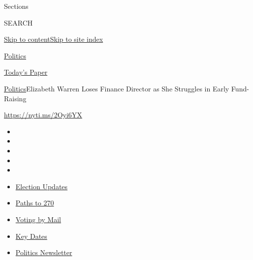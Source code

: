 Sections

SEARCH

\protect\hyperlink{site-content}{Skip to
content}\protect\hyperlink{site-index}{Skip to site index}

\href{https://www.nytimes3xbfgragh.onion/section/politics}{Politics}

\href{https://myaccount.nytimes3xbfgragh.onion/auth/login?response_type=cookie\&client_id=vi}{}

\href{https://www.nytimes3xbfgragh.onion/section/todayspaper}{Today's
Paper}

\href{/section/politics}{Politics}\textbar{}Elizabeth Warren Loses
Finance Director as She Struggles in Early Fund-Raising

\url{https://nyti.ms/2Oyi6YX}

\begin{itemize}
\item
\item
\item
\item
\item
\end{itemize}

\begin{itemize}
\item
  \href{https://www.nytimes3xbfgragh.onion/live/2020/09/08/us/trump-vs-biden?action=click\&pgtype=Article\&state=default\&region=TOP_BANNER\&context=storylines_menu}{Election
  Updates}
\item
  \href{https://www.nytimes3xbfgragh.onion/interactive/2020/us/elections/election-states-biden-trump.html?action=click\&pgtype=Article\&state=default\&region=TOP_BANNER\&context=storylines_menu}{Paths
  to 270}
\item
  \href{https://www.nytimes3xbfgragh.onion/interactive/2020/08/31/us/politics/vote-by-mail-deadlines.html?action=click\&pgtype=Article\&state=default\&region=TOP_BANNER\&context=storylines_menu}{Voting
  by Mail}
\item
  \href{https://www.nytimes3xbfgragh.onion/interactive/2019/us/elections/2020-presidential-election-calendar.html?action=click\&pgtype=Article\&state=default\&region=TOP_BANNER\&context=storylines_menu}{Key
  Dates}
\item
  \href{https://www.nytimes3xbfgragh.onion/newsletters/politics?action=click\&pgtype=Article\&state=default\&region=TOP_BANNER\&context=storylines_menu}{Politics
  Newsletter}
\end{itemize}

